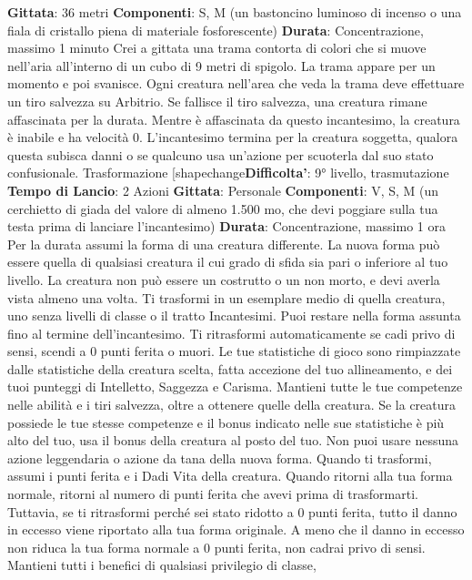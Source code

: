 \begin{multicols}{2}
\textbf{Gittata}: 36 metri
\textbf{Componenti}: S, M (un bastoncino luminoso di incenso
o una fiala di cristallo piena di materiale fosforescente)
\textbf{Durata}: Concentrazione, massimo 1 minuto
Crei a gittata una trama contorta di colori che si muove
nell’aria all’interno di un cubo di 9 metri di spigolo. La
trama appare per un momento e poi svanisce. Ogni
creatura nell’area che veda la trama deve effettuare un
tiro salvezza su Arbitrio. Se fallisce il tiro salvezza,
una creatura rimane affascinata per la durata. Mentre è
affascinata da questo incantesimo, la creatura è inabile
e ha velocità 0.
L’incantesimo termina per la creatura soggetta, qualora
questa subisca danni o se qualcuno usa un’azione per
scuoterla dal suo stato confusionale.
Trasformazione
[shapechange\textbf{Difficolta'}:
9° livello, trasmutazione
\textbf{Tempo di Lancio}: 2 Azioni
\textbf{Gittata}: Personale
\textbf{Componenti}: V, S, M (un cerchietto di giada del valore
di almeno 1.500 mo, che devi poggiare sulla tua testa
prima di lanciare l’incantesimo)
\textbf{Durata}: Concentrazione, massimo 1 ora
Per la durata assumi la forma di una creatura differente.
La nuova forma può essere quella di qualsiasi creatura
il cui grado di sfida sia pari o inferiore al tuo livello. La 
creatura non può essere un costrutto o un non morto, e
devi averla vista almeno una volta. Ti trasformi in un
esemplare medio di quella creatura, uno senza livelli di
classe o il tratto Incantesimi.
Puoi restare nella forma assunta fino al termine
dell’incantesimo. Ti ritrasformi automaticamente se cadi
privo di sensi, scendi a 0 punti ferita o muori.
Le tue statistiche di gioco sono rimpiazzate dalle
statistiche della creatura scelta, fatta accezione del tuo
allineamento, e dei tuoi punteggi di Intelletto,
Saggezza e Carisma. Mantieni tutte le tue competenze
nelle abilità e i tiri salvezza, oltre a ottenere quelle della
creatura. Se la creatura possiede le tue stesse
competenze e il bonus indicato nelle sue statistiche è
più alto del tuo, usa il bonus della creatura al posto del
tuo. Non puoi usare nessuna azione leggendaria o
azione da tana della nuova forma.
Quando ti trasformi, assumi i punti ferita e i Dadi Vita
della creatura. Quando ritorni alla tua forma normale,
ritorni al numero di punti ferita che avevi prima di
trasformarti. Tuttavia, se ti ritrasformi perché sei stato
ridotto a 0 punti ferita, tutto il danno in eccesso viene
riportato alla tua forma originale. A meno che il danno in
eccesso non riduca la tua forma normale a 0 punti
ferita, non cadrai privo di sensi.
Mantieni tutti i benefici di qualsiasi privilegio di classe,

\end{multicols}

